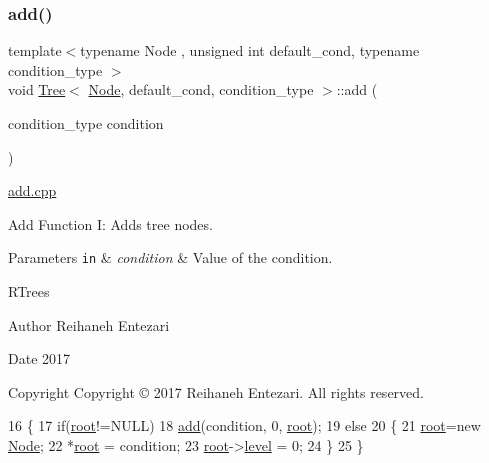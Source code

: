\subsubsection{\texorpdfstring{add()}{add()}\hspace{0.1cm}{\footnotesize\ttfamily [1/3]}}
{\footnotesize\ttfamily template$<$typename Node , unsigned int default\+\_\+cond, typename condition\+\_\+type $>$ \\
void \hyperlink{class_tree}{Tree}$<$ \hyperlink{struct_node}{Node}, default\+\_\+cond, condition\+\_\+type $>$\+::add (\begin{DoxyParamCaption}\item[{condition\+\_\+type}]{condition }\end{DoxyParamCaption})}



\hyperlink{add_8cpp}{add.\+cpp} 

Add Function I\+: Adds tree nodes. 
\begin{DoxyParams}[1]{Parameters}
\mbox{\tt in}  & {\em condition} & Value of the condition.\\
\hline
\end{DoxyParams}
R\+Trees \begin{DoxyAuthor}{Author}
Reihaneh Entezari 
\end{DoxyAuthor}
\begin{DoxyDate}{Date}
2017 
\end{DoxyDate}
\begin{DoxyCopyright}{Copyright}
Copyright © 2017 Reihaneh Entezari. All rights reserved. 
\end{DoxyCopyright}

\begin{DoxyCode}
16 \{
17     \textcolor{keywordflow}{if}(\hyperlink{class_tree_ae1cb548295b2e451164d89b16ac72d17}{root}!=NULL)
18         \hyperlink{class_tree_af8292ba7cef24827af0584b31cfc33a8}{add}(condition, 0, \hyperlink{class_tree_ae1cb548295b2e451164d89b16ac72d17}{root});
19     \textcolor{keywordflow}{else}
20     \{
21         \hyperlink{class_tree_ae1cb548295b2e451164d89b16ac72d17}{root}=\textcolor{keyword}{new} \hyperlink{struct_node}{Node};
22         *\hyperlink{class_tree_ae1cb548295b2e451164d89b16ac72d17}{root} = condition;
23         \hyperlink{class_tree_ae1cb548295b2e451164d89b16ac72d17}{root}->\hyperlink{struct_node_a64a379c6dd2c75ade9687670c517b7e7}{level} = 0;
24     \}
25 \}
\end{DoxyCode}
\mbox{\label{class_tree_a7c4512f8790d44351b07ed31491fd5e5}} 
